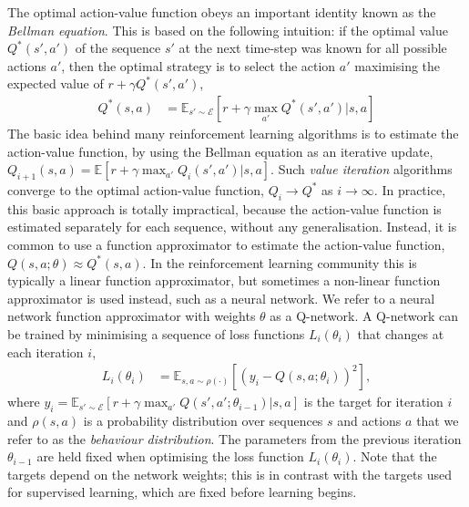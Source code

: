 \documentclass[a4paper, 11pt]{article}
\begin{document}
The optimal action-value function obeys an important identity known as the \emph{Bellman equation}. This is based on the following intuition: if the optimal value $Q^*(s',a')$ of the sequence $s'$ at the next time-step was known for all possible actions $a'$, then the optimal strategy is to select the action $a'$ maximising the expected value of $r + \gamma Q^*(s',a')$,
%
\begin{align}
Q^*(s,a) &= \mathbb E_{s' \sim \mathcal{E}}[r + \gamma \max_{a'} Q^*(s', a') \Big| s, a]
\end{align}
%
The basic idea behind many reinforcement learning algorithms is to estimate the action-value function, by using the Bellman equation as an iterative update, $Q_{i+1}(s,a) = \mathbb{E}\left[ r + \gamma \max_{a'} Q_i(s', a') | s, a \right]$. Such \emph{value iteration} algorithms converge to the optimal action-value function, $Q_i \rightarrow Q^*$ as $i \rightarrow \infty$. In practice, this basic approach is totally impractical, because the action-value function is estimated separately for each sequence, without any generalisation. Instead, it is common to use a function approximator to estimate the action-value function, $Q(s,a; \theta) \approx Q^*(s,a)$. In the reinforcement learning community this is typically a linear function approximator, but sometimes a non-linear function approximator is used instead, such as a neural network. We refer to a neural network function approximator with weights $\theta$ as a Q-network. A Q-network can be trained by minimising a sequence of loss functions $L_i(\theta_i)$ that changes at each iteration $i$,
%
\begin{align}
L_i\left(\theta_i\right) &= \mathbb E_{s,a \sim \rho(\cdot)}[\left(y_i - Q \left(s,a ; \theta_i \right) \right)^2],
\label{eq:q-learning-loss}
\end{align}
%
where $y_i = \mathbb E_{s' \sim \mathcal{E}}[r + \gamma \max_{a'} Q(s', a'; \theta_{i-1}) | s, a ]$ is the target for iteration $i$ and $\rho(s,a)$ is a probability distribution over sequences $s$ and actions $a$ that we refer to as the \emph{behaviour distribution}. The parameters from the previous iteration $\theta_{i-1}$ are held fixed when optimising the loss function $L_i\left(\theta_i\right)$. 
Note that the targets depend on the network weights; this is in contrast with the targets used for supervised learning, which are fixed before learning begins.
\end{document}
